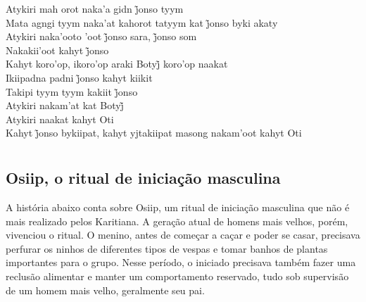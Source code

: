 \bigskip

\begin{linenumbers}\begingroup\raggedright
\noindent Atykiri mah orot naka’a gidn j̃onso tyym\\
Mata agngi tyym naka’at kahorot tatyym kat j̃onso byki akaty\\
Atykiri naka’ooto ’oot j̃onso sara, j̃onso som\\
Nakakii’oot kahyt j̃onso\\
Kahyt koro’op, ikoro’op araki Botyj̃ koro’op naakat\\
Ikiipadna padni j̃onso kahyt kiikit\\
Takipi tyym tyym kakiit j̃onso\\
Atykiri nakam’at kat Botyj̃\\
Atykiri naakat kahyt Oti\\
Kahyt j̃onso bykiipat, kahyt yjtakiipat masong nakam’oot kahyt Oti
\end{linenumbers}\endgroup

\chapter{}

\section{Osiip, o ritual de iniciação masculina}
 A história abaixo conta sobre Osiip, um ritual de iniciação masculina que
 não é mais realizado pelos Karitiana. A geração atual de homens mais
 velhos, porém, vivenciou o ritual. O menino, antes de começar a caçar e
 poder se casar, precisava perfurar os ninhos de diferentes tipos de
 vespas e tomar banhos de plantas importantes para o grupo. Nesse
 período, o iniciado precisava também fazer uma reclusão alimentar e
 manter um comportamento reservado, tudo sob supervisão de um homem mais
 velho, geralmente seu pai.

